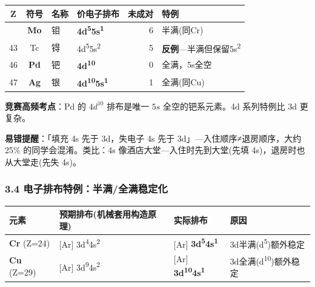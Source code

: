 {\def\LTcaptype{none} %
\begin{longtable}[]{@{}ccllrl@{}}
\toprule\noalign{}
Z & 符号 & 名称 & 价电子排布 & 未成对 & 特例 \\
\midrule\noalign{}
\endhead
\bottomrule\noalign{}
\endlastfoot
42 & \textbf{Mo} & 钼 & \textbf{4d\textsuperscript{5}5s\textsuperscript{1}} & 6 & 半满(同Cr) \\
43 & Tc & 锝 & 4d\textsuperscript{5}5s\textsuperscript{2} & 5 & \textbf{反例}---半满但保留5s\textsuperscript{2} \\
46 & \textbf{Pd} & 钯 & \textbf{4d\textsuperscript{10}} & 0 & 全满，5s全空 \\
47 & \textbf{Ag} & 银 & \textbf{4d\textsuperscript{10}5s\textsuperscript{1}} & 1 & 全满(同Cu) \\
\end{longtable}
}

\textbf{竞赛高频考点}：Pd 的 \(4d^{10}\) 排布是唯一 \(5s\) 全空的钯系元素。4d 系列特例比 3d 更复杂。

\textbf{易错提醒}：「填充 4s 先于 3d，失电子 4s 先于 3d」---入住顺序≠退房顺序，大约 25\% 的同学会混淆。类比：4s 像酒店大堂---入住时先到大堂(先填 4s)，退房时也从大堂走(先失 4s)。

\subsubsection{3.4 电子排布特例：半满/全满稳定化}\label{ux7535ux5b50ux6392ux5e03ux7279ux4f8bux534aux6ee1ux5168ux6ee1ux7a33ux5b9aux5316}

{\def\LTcaptype{none} %
\begin{longtable}[]{@{}
  >{\raggedright\arraybackslash}p{}
  >{\raggedright\arraybackslash}p{}
  >{\raggedright\arraybackslash}p{}
  >{\raggedright\arraybackslash}p{}@{}}
\toprule\noalign{}
\begin{minipage}[b]{\linewidth}\raggedright
元素
\end{minipage} & \begin{minipage}[b]{\linewidth}\raggedright
预期排布(机械套用构造原理)
\end{minipage} & \begin{minipage}[b]{\linewidth}\raggedright
实际排布
\end{minipage} & \begin{minipage}[b]{\linewidth}\raggedright
原因
\end{minipage} \\
\midrule\noalign{}
\endhead
\bottomrule\noalign{}
\endlastfoot
\textbf{Cr} (Z=24) & {[}Ar{]} 3d\textsuperscript{4}4s\textsuperscript{2} & {[}Ar{]} \textbf{3d\textsuperscript{5}4s\textsuperscript{1}} & 3d半满(d\textsuperscript{5})额外稳定 \\
\textbf{Cu} (Z=29) & {[}Ar{]} 3d\textsuperscript{9}4s\textsuperscript{2} & {[}Ar{]} \textbf{3d\textsuperscript{10}4s\textsuperscript{1}} & 3d全满(d\textsuperscript{10})额外稳定 \\
\end{longtable}
}


